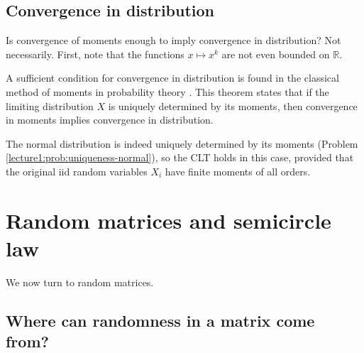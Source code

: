 \documentclass[letterpaper,11pt,oneside,reqno]{book}
\numberwithin{equation}{chapter}  %
\theoremstyle{definition}
\begin{document}
\subsection{Convergence in distribution}

Is convergence of moments enough to imply convergence in
distribution? Not necessarily. First, note that the functions
$x\mapsto x^k$ are not even bounded on $\mathbb{R}$.

A sufficient condition for convergence in distribution is
found in the
classical method of moments in
probability theory \cite[Theorem~30.2]{billingsley1995probability}.
This theorem
states that
if the limiting distribution $X$ is uniquely determined by its moments,
then convergence in moments implies convergence in distribution.

The normal distribution is indeed uniquely determined by its
moments (Problem \ref{lecture1:prob:uniqueness-normal}),
so the CLT holds in this case, provided that the
original iid random variables $X_i$ have finite moments of
all orders.

\section{Random matrices and semicircle law}

We now turn to random matrices.

\subsection{Where can randomness in a matrix come from?}
\end{document}
